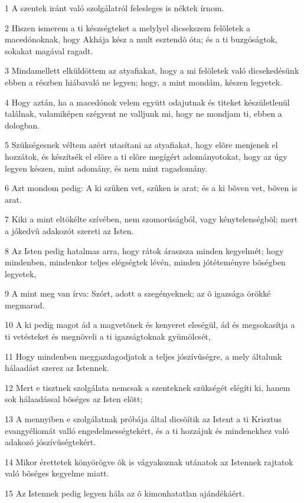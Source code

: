 \par 1 A szentek iránt való szolgálatról felesleges is néktek írnom.
\par 2 Hiszen ismerem a ti készségteket a melylyel dicsekszem felõletek a macedónoknak, hogy Akhája kész a mult esztendõ óta; és a ti buzgóságtok, sokakat magával ragadt.
\par 3 Mindamellett elküldöttem az atyafiakat, hogy a mi felõletek való dicsekedésünk ebben a részben hiábavaló ne legyen; hogy, a mint mondám, készen legyetek.
\par 4 Hogy aztán, ha a macedónok velem együtt odajutnak és titeket készületlenül találnak, valamiképen szégyent ne valljunk mi, hogy ne mondjam ti, ebben a dologban.
\par 5 Szükségesnek véltem azért utasítani az atyafiakat, hogy elõre menjenek el hozzátok, és készítsék el elõre a ti elõre megígért adományotokat, hogy az úgy legyen készen, mint adomány, és nem mint ragadomány.
\par 6 Azt mondom pedig: A ki szûken vet, szûken is arat; és a ki bõven vet, bõven is arat.
\par 7 Kiki a mint eltökélte szívében, nem szomorúságból, vagy kénytelenségbõl; mert a jókedvû adakozót szereti az Isten.
\par 8 Az Isten pedig hatalmas arra, hogy rátok áraszsza minden kegyelmét; hogy mindenben, mindenkor teljes elégségtek lévén, minden jótéteményre bõségben legyetek,
\par 9 A mint meg van írva: Szórt, adott a szegényeknek; az õ igazsága örökké megmarad.
\par 10 A ki pedig magot ád a magvetõnek és kenyeret eleségül, ád és megsokasítja a ti vetésteket és megnöveli a ti igazságtoknak gyümölcsét,
\par 11 Hogy mindenben meggazdagodjatok a teljes jószívûségre, a mely általunk hálaadást szerez az Istennek.
\par 12 Mert e tisztnek szolgálata nemcsak a szenteknek szükségét elégíti ki, hanem sok hálaadással bõséges az Isten elõtt;
\par 13 A mennyiben e szolgálatnak próbája által dicsõítik az Istent a ti Krisztus evangyéliomát valló engedelmességtekért, és a ti hozzájuk és mindenekhez való adakozó jószívûségtekért.
\par 14 Mikor érettetek könyörögve õk is vágyakoznak utánatok az Istennek rajtatok való bõséges kegyelme miatt.
\par 15 Az Istennek pedig legyen hála az õ kimonhatatlan ajándékáért.

